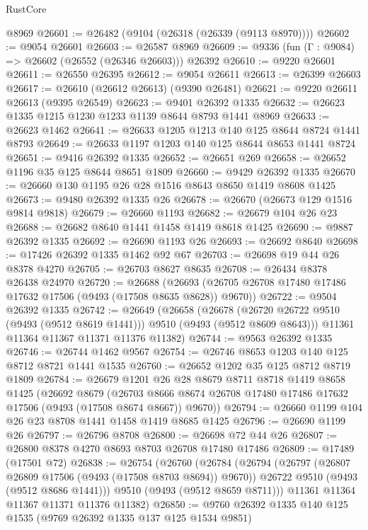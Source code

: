 \begin{lexlean}{RustCore}
\begin{coremodule}
    @8969
@26601 := @26482 (@9104 (@26318 (@26339 (@9113 @8970))))
@26602 := @9054 @26601
@26603 := @26587 @8969
@26609 := @9336 (fun (Γ : @9084) => @26602 (@26552 (@26346 @26603))) @26392
@26610 := @9220 @26601
@26611 := @26550 @26395
@26612 := @9054 @26611
@26613 := @26399 @26603
@26617 := @26610 (@26612 @26613) (@9390 @26481)
@26621 := @9220 @26611 @26613 (@9395 @26549)
@26623 := @9401 @26392 @1335
@26632 := @26623 @1335 @1215 @1230 @1233 @1139 @8644 @8793 @1441 @8969
@26633 := @26623 @1462
@26641 := @26633 @1205 @1213 @140 @125 @8644 @8724 @1441 @8793
@26649 := @26633 @1197 @1203 @140 @125 @8644 @8653 @1441 @8724
@26651 := @9416 @26392 @1335
@26652 := @26651 @269
@26658 := @26652 @1196 @35 @125 @8644 @8651 @1809
@26660 := @9429 @26392 @1335
@26670 := @26660 @130 @1195 @26 @28 @1516 @8643 @8650 @1419 @8608 @1425
@26673 := @9480 @26392 @1335 @26
@26678 := @26670 (@26673 @129 @1516 @9814 @9818)
@26679 := @26660 @1193
@26682 := @26679 @104 @26 @23
@26688 := @26682 @8640 @1441 @1458 @1419 @8618 @1425
@26690 := @9887 @26392 @1335
@26692 := @26690 @1193 @26
@26693 := @26692 @8640
@26698 := @17426 @26392 @1335 @1462 @92 @67
@26703 := @26698 @19 @44 @26 @8378 @4270
@26705 := @26703 @8627 @8635
@26708 := @26434 @8378 @26438 @24970
@26720 := @26688
    (@26693 (@26705 @26708 @17480 @17486 @17632 @17506 (@9493 (@17508 @8635 @8628)) @9670))
@26722 := @9504 @26392 @1335
@26742 := @26649
    (@26658
      (@26678 (@26720 @26722 @9510 (@9493 (@9512 @8619 @1441))) @9510 (@9493 (@9512 @8609 @8643)))
      @11361
      @11364
      @11367
      @11371
      @11376
      @11382)
@26744 := @9563 @26392 @1335
@26746 := @26744 @1462 @9567
@26754 := @26746 @8653 @1203 @140 @125 @8712 @8721 @1441 @1535
@26760 := @26652 @1202 @35 @125 @8712 @8719 @1809
@26784 := @26679
    @1201
    @26
    @28
    @8679
    @8711
    @8718
    @1419
    @8658
    @1425
    (@26692
      @8679
      (@26703 @8666 @8674 @26708 @17480 @17486 @17632 @17506 (@9493 (@17508 @8674 @8667)) @9670))
@26794 := @26660 @1199 @104 @26 @23 @8708 @1441 @1458 @1419 @8685 @1425
@26796 := @26690 @1199 @26
@26797 := @26796 @8708
@26800 := @26698 @72 @44 @26
@26807 := @26800 @8378 @4270 @8693 @8703 @26708 @17480 @17486
@26809 := @17489 (@17501 @72)
@26838 := @26754
    (@26760
      (@26784
        (@26794
          (@26797 (@26807 @26809 @17506 (@9493 (@17508 @8703 @8694)) @9670))
          @26722
          @9510
          (@9493 (@9512 @8686 @1441)))
        @9510
        (@9493 (@9512 @8659 @8711)))
      @11361
      @11364
      @11367
      @11371
      @11376
      @11382)
@26850 := @9760 @26392 @1335 @140 @125 @1535 (@9769 @26392 @1335 @137 @125 @1534 @9851)

\end{coremodule}
\end{lexlean}
